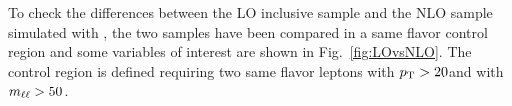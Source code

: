 To check the differences between the LO inclusive sample and the NLO sample simulated with \MCATNLO, the two samples have been compared in a same flavor control region and some variables of interest are shown in Fig.~\ref{fig:LOvsNLO}. The control region is defined requiring two same flavor leptons with $p_{\mathrm{T}} > 20$\GeV and with $m_{\ell\ell} > 50$\GeV.


\begin{figure}[htbp]
\centering
{}
\\
\end{figure}
